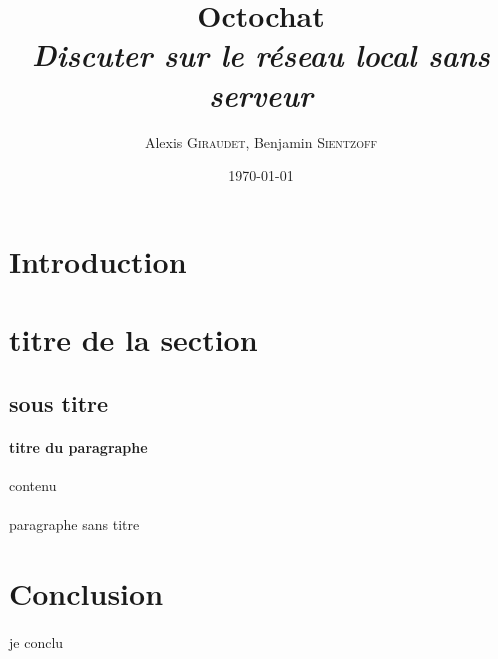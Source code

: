 \documentclass[a4paper]{article}
\title{Octochat \\ \textit{Discuter sur le réseau local sans serveur}}
\author{Alexis \textsc{Giraudet}, Benjamin \textsc{Sientzoff}}
\date{\today}
\begin{document}
	\maketitle
	\vspace{5cm}
	\tableofcontents
	\newpage
	
	\section*{Introduction}
	
	\newpage
	
	\section{titre de la section}
		\subsection{sous titre}
		\paragraph{titre du paragraphe}{contenu}
		\paragraph{}{paragraphe sans titre}
	\newpage %
	
	\section*{Conclusion}
		\paragraph{}{je conclu}
		
\end{document}
